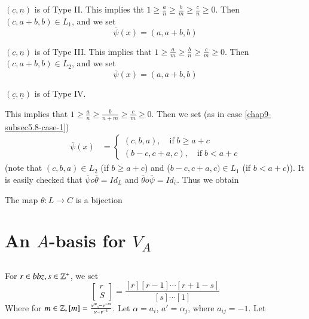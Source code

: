 \begin{case}\label{chap9-subsec5.8-case-2}
$(\underline{c}, \underline{n})$ is of Type II. This implies tht $ 1 \geq \frac{a}{n} \geq \frac{b}{m} \geq \frac{c}{n} \geq 0$. Then
$(c, a+b, b) \in L_{1}$, and we set
$$
\overline{\psi}(x) = (a, a+b, b)
$$
\end{case}

\begin{case}\label{chap9-subsec5.8-case-3}
$(\underline{c}, \underline{n})$ is of Type III. This implies that $ 1 \geq \frac{a}{m} \geq \frac{b}{n} \geq \frac{c}{m} \geq 0$. Then
$(c, a+b, b) \in L_{2}$, and we set
$$
\overline{\psi}(x) = (a, a+b, b)
$$
\end{case}

\begin{case}\label{chap9-subsec5.8-case-4}
$(\underline{c}, \underline{n})$ is of Type IV.

This implies that $ 1 \geq \frac{a}{n} \geq \frac{b}{n+m} \geq \frac{c}{m} \geq 0$. Then we set
(as in case \ref{chap9-subsec5.8-case-1})
\begin{align*}
\overline{\psi} (x) &=
\begin{cases}
(c,b,a ), \quad \text{if} \; b \geq a + c\\
(b-c, c+a, c), \quad \text{if} \; b < a + c
\end{cases}
\end{align*}
(note that $(c, b, a)\in L_{2}$ (if $ b \geq a + c$) and ($b-c, c+a, c) \in L_{1}$ (if $b < a+ c$)).  It is easily checked that $\overline{\psi} o \overline{\theta} = Id_{L}$ and $\overline{\theta}o \overline{\psi} = Id_{\overline{c}}$. Thus we obtain 
\end{case}

\setcounter{definition}{8}
\begin{secthm}\label{chap9-thm-5.9}
The map $\theta : L \rightarrow C$ is a bijection
\end{secthm}

\section{An $A$-basis for $V_{A}$}\label{chap9-sec-6}
\pageoriginale

\subsection{}\label{chap9-subsec-6.1}
For $r \in bbz, s \in \mathbb{Z}^{+}$, we set
$$
\begin{bmatrix}
r\\
S
\end{bmatrix}
= \frac{[r][r-1]\cdots [r + 1-s]}{[s]\cdots[1]}
$$
Where for $m \in \mathbb{Z} , [m] =\frac{\nu^{m}, -\nu^{-m}}{\nu-\nu^{-1}}$. Let $\alpha= a_{i}$, $a' = \alpha_{j}$, where $a_{ij}= -1$. Let 

